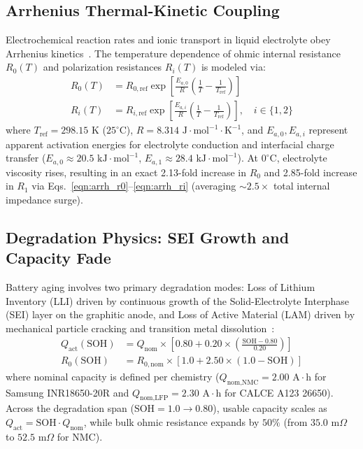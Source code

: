 \documentclass[balance,nocopyright,upint,varvw,hyphenate,barcolor=NavyBlue,nolists]{asmejour}
\begin{document}
\subsection{Arrhenius Thermal-Kinetic Coupling}
Electrochemical reaction rates and ionic transport in liquid electrolyte obey Arrhenius kinetics~\cite{He2011ecm,Ren2019aging}. The temperature dependence of ohmic internal resistance $R_0(T)$ and polarization resistances $R_i(T)$ is modeled via:
\begin{align}
R_0(T) &= R_{0,\text{ref}} \exp\left[\frac{E_{a,0}}{R}\left(\frac{1}{T} - \frac{1}{T_{\text{ref}}}\right)\right] \label{eqn:arrh_r0}\\
R_i(T) &= R_{i,\text{ref}} \exp\left[\frac{E_{a,i}}{R}\left(\frac{1}{T} - \frac{1}{T_{\text{ref}}}\right)\right], \quad i \in \{1, 2\} \label{eqn:arrh_ri}
\end{align}
where $T_{\text{ref}} = 298.15\text{ K}$ ($25^\circ\text{C}$), $R = 8.314\text{ J}\cdot\text{mol}^{-1}\cdot\text{K}^{-1}$, and $E_{a,0}, E_{a,i}$ represent apparent activation energies for electrolyte conduction and interfacial charge transfer ($E_{a,0} \approx 20.5\text{ kJ}\cdot\text{mol}^{-1}$, $E_{a,1} \approx 28.4\text{ kJ}\cdot\text{mol}^{-1}$). At $0^\circ\text{C}$, electrolyte viscosity rises, resulting in an exact 2.13-fold increase in $R_0$ and 2.85-fold increase in $R_1$ via Eqs.~\eqref{eqn:arrh_r0}--\eqref{eqn:arrh_ri} (averaging $\sim 2.5\times$ total internal impedance surge).

\subsection{Degradation Physics: SEI Growth and Capacity Fade}
Battery aging involves two primary degradation modes: Loss of Lithium Inventory (LLI) driven by continuous growth of the Solid-Electrolyte Interphase (SEI) layer on the graphitic anode, and Loss of Active Material (LAM) driven by mechanical particle cracking and transition metal dissolution~\cite{Birkl2017diagnostics,Ren2019aging}:
\begin{align}
Q_{\text{act}}(\text{SOH}) &= Q_{\text{nom}} \times \left[0.80 + 0.20 \times \left(\frac{\text{SOH} - 0.80}{0.20}\right)\right] \label{eqn:aging_q}\\
R_0(\text{SOH}) &= R_{0,\text{nom}} \times \left[1.0 + 2.50 \times (1.0 - \text{SOH})\right] \label{eqn:aging_r0}
\end{align}
where nominal capacity is defined per chemistry ($Q_{\text{nom,NMC}} = 2.00\text{ A}\cdot\text{h}$ for Samsung INR18650-20R and $Q_{\text{nom,LFP}} = 2.30\text{ A}\cdot\text{h}$ for CALCE A123 26650). Across the degradation span ($\text{SOH} = 1.0 \to 0.80$), usable capacity scales as $Q_{\text{act}} = \text{SOH} \cdot Q_{\text{nom}}$, while bulk ohmic resistance expands by $50\%$ (from $35.0\text{ m}\Omega$ to $52.5\text{ m}\Omega$ for NMC).
\end{document}
